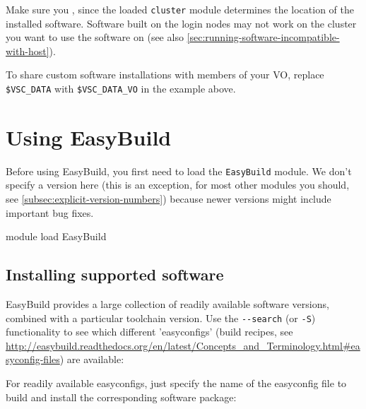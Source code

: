 Make sure you , since the loaded \lstinline|cluster|
module determines the location of the installed software. Software built on the login
nodes may not work on the cluster you want to use the software on (see also \autoref{sec:running-software-incompatible-with-host}).

To share custom software installations with members of your VO, replace \lstinline|$VSC_DATA|
with \lstinline|$VSC_DATA_VO| in the example above.

\section{Using EasyBuild}

Before using EasyBuild, you first need to load the \lstinline|EasyBuild| module. We don't specify
a version here (this is an exception, for most other modules you should, see \autoref{subsec:explicit-version-numbers}) because newer versions
might include important bug fixes.

\begin{prompt}
module load EasyBuild
\end{prompt}

\subsection{Installing supported software}

EasyBuild provides a large collection of readily available software versions,
combined with a particular toolchain version. Use the \lstinline|--search|
(or \lstinline|-S|) functionality to see which different 'easyconfigs'
(build recipes, see \url{http://easybuild.readthedocs.org/en/latest/Concepts_and_Terminology.html#easyconfig-files}) are available:


For readily available easyconfigs, just specify the name of the easyconfig file to build
and install the corresponding software package:

\begin{prompt}
\end{prompt}

